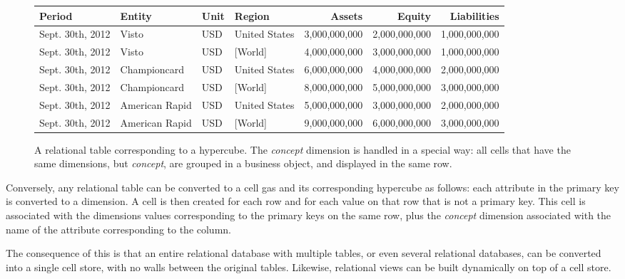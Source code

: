 \documentclass{acm_proc_article-sp}
\begin{document}
\begin{figure*}
\centering
\vspace{3mm}
\begin{tabular}{llllrrr}
\hline
\hline
Period & Entity & Unit & Region & Assets & Equity & Liabilities \\
\hline
Sept. 30th, 2012 & Visto & USD & United States & 3,000,000,000 & 2,000,000,000 & 1,000,000,000 \\
Sept. 30th, 2012 & Visto & USD & [World] & 4,000,000,000 & 3,000,000,000 & 1,000,000,000 \\

Sept. 30th, 2012 & Championcard & USD & United States & 6,000,000,000 & 4,000,000,000 & 2,000,000,000 \\

Sept. 30th, 2012 & Championcard & USD & [World] & 8,000,000,000 & 5,000,000,000 & 3,000,000,000 \\

Sept. 30th, 2012 & American Rapid & USD & United States & 5,000,000,000 & 3,000,000,000 & 2,000,000,000 \\

Sept. 30th, 2012 & American Rapid & USD & [World] & 9,000,000,000 & 6,000,000,000 & 3,000,000,000 \\

\hline
\end{tabular}
\caption{A relational table corresponding to a hypercube. The \emph{concept} dimension is handled in a special way: all cells that have the same dimensions, but \emph{concept}, are grouped in a business object, and displayed in the same row.}
\label{fig-relationalized}
\end{figure*}

Conversely, any relational table can be converted to a cell gas and its corresponding hypercube as follows: each attribute in the primary key is converted to a dimension. A cell is
then created for each row and for each value on that row that is not a primary key. This cell is associated with the dimensions values corresponding to the primary keys on the same row, plus the \emph{concept} dimension associated with the name of the attribute corresponding to the column.

The consequence of this is that an entire relational database with multiple tables, or even several relational databases, can be converted into a single cell store, with no walls between the original tables. Likewise, relational views can be built dynamically on top of a cell store.
\end{document}
